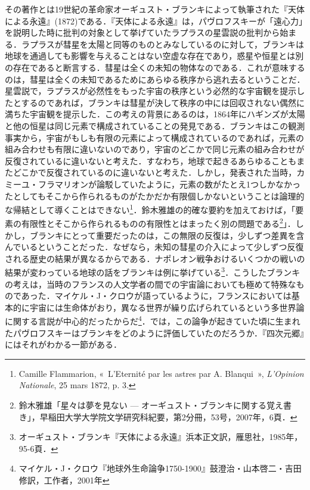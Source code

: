 その著作とは19世紀の革命家オーギュスト・ブランキによって執筆された『天体による永遠』(1872)である．『天体による永遠』は，パヴロフスキーが「遠心力」を説明した時に批判の対象として挙げていたラプラスの星雲説の批判から始まる．ラプラスが彗星を太陽と同等のものとみなしているのに対して，ブランキは地球を通過しても影響を与えることはない空虚な存在であり，惑星や恒星とは別の存在であると断言する．彗星は全くの未知の物体なのである．これが意味するのは，彗星は全くの未知であるためにあらゆる秩序から逃れ去るということだ．星雲説で，ラプラスが必然性をもった宇宙の秩序という必然的な宇宙観を提示したとするのであれば，ブランキは彗星が決して秩序の中には回収されない偶然に満ちた宇宙観を提示した．この考えの背景にあるのは，1864年にハギンズが太陽と他の恒星は同じ元素で構成されていることの発見である．ブランキはこの観測事実から，宇宙がもしも有限の元素によって構成されているのであれば，元素の組み合わせも有限に違いないのであり，宇宙のどこかで同じ元素の組み合わせが反復されているに違いないと考えた．すなわち，地球で起きるあらゆることもまたどこかで反復されているのに違いないと考えた．しかし，発表された当時，カミーユ・フラマリオンが論駁していたように，元素の数がたとえ1つしかなかったとしてもそこから作られるものがたかだか有限個しかないということは論理的な帰結として導くことはできない\footnote{Camille Flammarion, «~L'Eternité par les astres par A. Blanqui~», \emph{L'Opinion Nationale}, 25 mars 1872, p. 3.}．鈴木雅雄の的確な要約を加えておけば，「要素の有限性とそこから作られるものの有限性とはまったく別の問題である\footnote{鈴木雅雄「星々は夢を見ない --- オーギュスト・ブランキに関する覚え書き」，早稲田大学大学院文学研究科紀要，第2分冊，53号，2007年，6頁．}」．しかし，ブランキにとって重要だったのは，この無限の反復は，少しずつ差異を含んでいるということだった．なぜなら，未知の彗星の介入によって少しずつ反復される歴史の結果が異なるからである．ナポレオン戦争おけるいくつかの戦いの結果が変わっている地球の話をブランキは例に挙げている\footnote{オーギュスト・ブランキ『天体による永遠』浜本正文訳，雁思社，1985年，95-6頁．}．こうしたブランキの考えは，当時のフランスの人文学者の間での宇宙論においても極めて特殊なものであった．マイケル・J・クロウが語っているように，フランスにおいては基本的に宇宙には生命体がおり，異なる世界が繰り広げられているという多世界論に関する言説が中心的だったからだ\footnote{マイケル・J・クロウ『地球外生命論争1750-1900』鼓澄治・山本啓二・吉田修訳，工作者，2001年}．では，この論争が起きていた頃に生まれたパヴロフスキーはブランキをどのように評価していたのだろうか．『四次元郷』にはそれがわかる一節がある．

